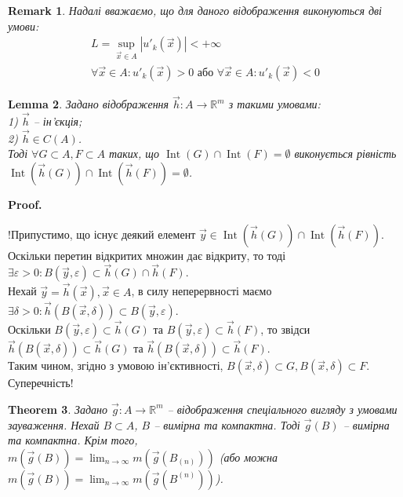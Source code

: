 \documentclass[a4paper, 10pt]{article}
\makeatletter
\def\qed{$\blacksquare$}
\theoremstyle{theoremdd}
\newtheorem{theorem}{Theorem}[subsection]
\theoremstyle{theoremdd}
\theoremstyle{theoremdd}
\theoremstyle{theoremdd}
\theoremstyle{theoremdd}
\theoremstyle{theoremdd}
\theoremstyle{theoremdd}
\theoremstyle{theoremdd}
\theoremstyle{theoremdd}
\theoremstyle{theoremdd}
\theoremstyle{theoremdd}
\newtheorem{remark}[theorem]{Remark}
\theoremstyle{theoremdd}
\theoremstyle{theoremdd}
\newtheorem{lemma}[theorem]{Lemma}
\theoremstyle{theoremdd}
\theoremstyle{theoremdd}
\renewenvironment{proof}[1][Proof.\\]{\par
\pushQED{\hfill \qed}%
\normalfont \topsep6\p@\@plus6\p@\relax
\trivlist
\item\relax
{\bfseries
#1\@addpunct{.}}\hspace\labelsep\ignorespaces
}{%
\popQED\endtrivlist\@endpefalse
}
\DeclareMathOperator{\Int}{Int}
\makeatother
\begin{document}
\begin{remark}
Надалі вважаємо, що для даного відображення виконуються дві умови:
\begin{align*}
L = \sup_{\vec{x} \in A} |u'_k(\vec{x})| < +\infty \\
\forall \vec{x} \in A: u'_k(\vec{x}) > 0 \text{ або } \forall \vec{x} \in A: u'_k(\vec{x}) < 0
\end{align*}
\end{remark}

\begin{lemma}
Задано відображення $\vec{h} \colon A \to \mathbb{R}^m$ з такими умовами:\\
1) $\vec{h}$ -- ін'єкція;\\
2) $\vec{h} \in C(A)$.\\
Тоді $\forall G \subset A, F \subset A$ таких, що $\Int(G) \cap \Int(F) = \emptyset$ виконується рівність $\Int(\vec{h}(G)) \cap \Int(\vec{h}(F)) = \emptyset$.
\end{lemma}

\begin{proof}
!Припустимо, що існує деякий елемент $\vec{y} \in \Int(\vec{h}(G)) \cap \Int(\vec{h}(F))$. Оскільки перетин відкритих множин дає відкриту, то тоді $\exists \varepsilon > 0: B(\vec{y}, \varepsilon) \subset \vec{h}(G) \cap \vec{h}(F)$.\\
Нехай $\vec{y} = \vec{h}(\vec{x}), \vec{x} \in A$, в силу неперервності маємо $\exists \delta > 0: \vec{h}(B( \vec{x}, \delta )) \subset B(\vec{y},\varepsilon)$.\\
Оскільки $B(\vec{y},\varepsilon) \subset \vec{h}(G)$ та $B(\vec{y},\varepsilon) \subset \vec{h}(F)$, то звідси $\vec{h}(B(\vec{x},\delta)) \subset \vec{h}(G)$ та $\vec{h}(B(\vec{x},\delta)) \subset \vec{h}(F)$.\\
Таким чином, згідно з умовою ін'єктивності, $B(\vec{x},\delta) \subset G, B(\vec{x},\delta) \subset F$. Суперечність!
\end{proof}

\begin{theorem}
Задано $\vec{g} \colon A \to \mathbb{R}^m$ -- відображення спеціального вигляду з умовами зауваження. Нехай $B \subset A$, $B$ -- вимірна та компактна. Тоді $\vec{g}(B)$ -- вимірна та компактна. Крім того,\\
$m(\vec{g}(B)) = \displaystyle\lim_{n \to \infty} m(\vec{g}(B_{(n)}))$ (або можна $m(\vec{g}(B)) = \displaystyle\lim_{n \to \infty} m(\vec{g}(B^{(n)}))$).
\end{theorem}
\end{document}
